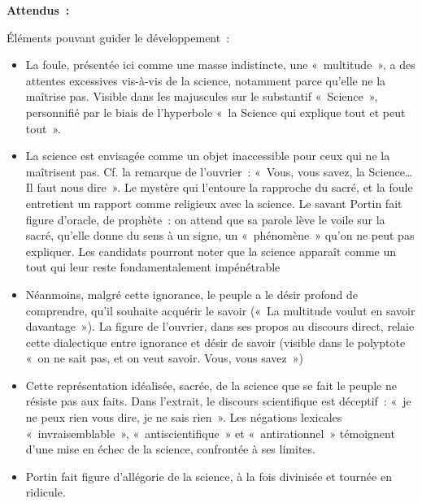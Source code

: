{\textbf{Attendus~:}

Éléments pouvant guider le développement~:

\begin{itemize}
\item La foule, présentée ici comme une masse indistincte, une «~multitude~», a des
attentes excessives vis-à-vis de la science, notamment parce qu'elle ne la maîtrise
pas. Visible dans les majuscules sur le substantif «~Science~», personnifié par le biais
de l'hyperbole «~la Science qui explique tout et peut tout~».
\item La science est envisagée comme un objet inaccessible pour ceux qui ne la maîtrisent
pas. Cf. la remarque de l'ouvrier~: «~Vous, vous savez, la Science… Il faut nous dire~».
Le mystère qui l'entoure la rapproche du sacré, et la foule entretient un rapport comme
religieux avec la science. Le savant Portin fait figure d'oracle, de prophète~: on attend
que sa parole lève le voile sur la sacré, qu'elle donne du sens à un signe, un
«~phénomène~» qu'on ne peut pas expliquer. Les candidats pourront noter que la
science apparaît comme un tout qui leur reste fondamentalement impénétrable
\item Néanmoins, malgré cette ignorance, le peuple a le désir profond de comprendre, qu'il
souhaite acquérir le savoir («~La multitude voulut en savoir davantage~»). La figure de
l'ouvrier, dans ses propos au discours direct, relaie cette dialectique entre ignorance
et désir de savoir (visible dans le polyptote «~on ne sait pas, et on veut savoir. Vous,
vous savez~»)
\item Cette représentation idéalisée, sacrée, de la science que se fait le peuple ne résiste
pas aux faits. Dans l'extrait, le discours scientifique est déceptif~: «~je ne peux rien vous
dire, je ne sais rien~». Les négations lexicales «~invraisemblable~», «~antiscientifique~»
et «~antirationnel~» témoignent d'une mise en échec de la science, confrontée à ses
limites.
\item Portin fait figure d'allégorie de la science, à la fois divinisée et tournée en ridicule.

\end{itemize}}
